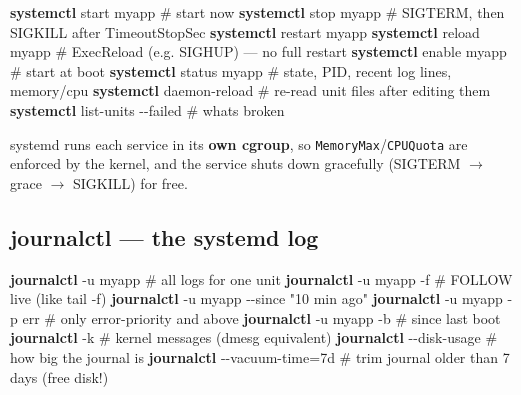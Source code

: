 \documentclass[11pt]{article}
\newenvironment{Shaded}{\begin{snugshade}}{\end{snugshade}}
\newcommand{\AttributeTok}[1]{\textcolor[rgb]{0.16,0.50,0.73}{#1}}
\newcommand{\CommentTok}[1]{\textcolor[rgb]{0.48,0.49,0.49}{#1}}
\newcommand{\ExtensionTok}[1]{\textcolor[rgb]{0.00,0.60,1.00}{\textbf{#1}}}
\newcommand{\NormalTok}[1]{\textcolor[rgb]{0.81,0.81,0.76}{#1}}
\newcommand{\OperatorTok}[1]{\textcolor[rgb]{0.81,0.81,0.76}{#1}}
\newcommand{\StringTok}[1]{\textcolor[rgb]{0.96,0.31,0.31}{#1}}
\begin{document}
\begin{Shaded}
\begin{Highlighting}[]
\ExtensionTok{systemctl}\NormalTok{ start   myapp            }\CommentTok{\# start now}
\ExtensionTok{systemctl}\NormalTok{ stop    myapp            }\CommentTok{\# SIGTERM, then SIGKILL after TimeoutStopSec}
\ExtensionTok{systemctl}\NormalTok{ restart myapp}
\ExtensionTok{systemctl}\NormalTok{ reload  myapp            }\CommentTok{\# ExecReload (e.g. SIGHUP) — no full restart}
\ExtensionTok{systemctl}\NormalTok{ enable  myapp            }\CommentTok{\# start at boot}
\ExtensionTok{systemctl}\NormalTok{ status  myapp            }\CommentTok{\# state, PID, recent log lines, memory/cpu}
\ExtensionTok{systemctl}\NormalTok{ daemon{-}reload            }\CommentTok{\# re{-}read unit files after editing them}
\ExtensionTok{systemctl}\NormalTok{ list{-}units }\AttributeTok{{-}{-}failed}      \CommentTok{\# what\textquotesingle{}s broken}
\end{Highlighting}
\end{Shaded}

systemd runs each service in its \textbf{own cgroup}, so \texttt{MemoryMax}/\texttt{CPUQuota} are enforced by the kernel, and the service shuts down gracefully (SIGTERM \(\rightarrow\) grace \(\rightarrow\) SIGKILL) for free.

\subsection{journalctl --- the systemd log}\label{journalctl--the-systemd-log}


\begin{Shaded}
\begin{Highlighting}[]
\ExtensionTok{journalctl} \AttributeTok{{-}u}\NormalTok{ myapp                }\CommentTok{\# all logs for one unit}
\ExtensionTok{journalctl} \AttributeTok{{-}u}\NormalTok{ myapp }\AttributeTok{{-}f}             \CommentTok{\# FOLLOW live (like tail {-}f)}
\ExtensionTok{journalctl} \AttributeTok{{-}u}\NormalTok{ myapp }\AttributeTok{{-}{-}since} \StringTok{"10 min ago"}
\ExtensionTok{journalctl} \AttributeTok{{-}u}\NormalTok{ myapp }\AttributeTok{{-}p}\NormalTok{ err         }\CommentTok{\# only error{-}priority and above}
\ExtensionTok{journalctl} \AttributeTok{{-}u}\NormalTok{ myapp }\AttributeTok{{-}b}             \CommentTok{\# since last boot}
\ExtensionTok{journalctl} \AttributeTok{{-}k}                      \CommentTok{\# kernel messages (dmesg equivalent)}
\ExtensionTok{journalctl} \AttributeTok{{-}{-}disk{-}usage}            \CommentTok{\# how big the journal is}
\ExtensionTok{journalctl} \AttributeTok{{-}{-}vacuum{-}time}\OperatorTok{=}\NormalTok{7d        }\CommentTok{\# trim journal older than 7 days (free disk!)}
\end{Highlighting}
\end{Shaded}
\end{document}
